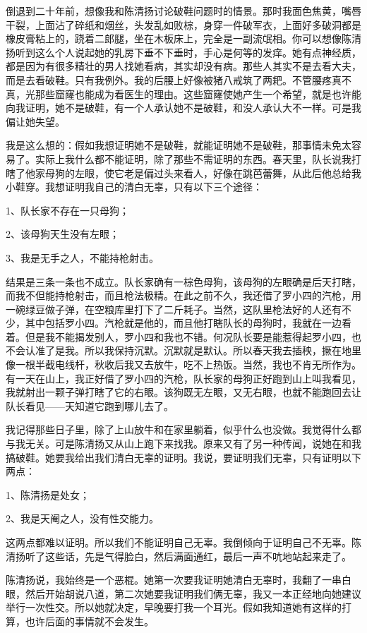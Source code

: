 倒退到二十年前，想像我和陈清扬讨论破鞋问题时的情景。那时我面色焦黄，嘴唇干裂，上面沾了碎纸和烟丝，头发乱如败棕，身穿一件破军衣，上面好多破洞都是橡皮膏粘上的，跷着二郎腿，坐在木板床上，完全是一副流氓相。你可以想像陈清扬听到这么个人说起她的乳房下垂不下垂时，手心是何等的发痒。她有点神经质，都是因为有很多精壮的男人找她看病，其实却没有病。那些人其实不是去看大夫，而是去看破鞋。只有我例外。我的后腰上好像被猪八戒筑了两耙。不管腰疼真不真，光那些窟窿也能成为看医生的理由。这些窟窿使她产生一个希望，就是也许能向我证明，她不是破鞋，有一个人承认她不是破鞋，和没人承认大不一样。可是我偏让她失望。 
 
我是这么想的：假如我想证明她不是破鞋，就能证明她不是破鞋，那事情未免太容易了。实际上我什么都不能证明，除了那些不需证明的东西。春天里，队长说我打瞎了他家母狗的左眼，使它老是偏过头来看人，好像在跳芭蕾舞，从此后他总给我小鞋穿。我想证明我自己的清白无辜，只有以下三个途径： 
 
 1、队长家不存在一只母狗； 
 
 2、该母狗天生没有左眼； 
 
 3、我是无手之人，不能持枪射击。 
 
 结果是三条一条也不成立。队长家确有一棕色母狗，该母狗的左眼确是后天打瞎，而我不但能持枪射击，而且枪法极精。在此之前不久，我还借了罗小四的汽枪，用一碗绿豆做子弹，在空粮库里打下了二斤耗子。当然，这队里枪法好的人还有不少，其中包括罗小四。汽枪就是他的，而且他打瞎队长的母狗时，我就在一边看着。但是我不能揭发别人，罗小四和我也不错。何况队长要是能惹得起罗小四，也不会认准了是我。所以我保持沉默。沉默就是默认。所以春天我去插秧，撅在地里像一根半截电线杆，秋收后我又去放牛，吃不上热饭。当然，我也不肯无所作为。有一天在山上，我正好借了罗小四的汽枪，队长家的母狗正好跑到山上叫我看见，我就射出一颗子弹打瞎了它的右眼。该狗既无左眼，又无右眼，也就不能跑回去让队长看见——天知道它跑到哪儿去了。 
 
 我记得那些日子里，除了上山放牛和在家里躺着，似乎什么也没做。我觉得什么都与我无关。可是陈清扬又从山上跑下来找我。原来又有了另一种传闻，说她在和我搞破鞋。她要我给出我们清白无辜的证明。我说，要证明我们无辜，只有证明以下两点： 
 
 1、陈清扬是处女； 
 
 2、我是天阉之人，没有性交能力。 
 
 这两点都难以证明。所以我们不能证明自己无辜。我倒倾向于证明自己不无辜。陈清扬听了这些话，先是气得脸白，然后满面通红，最后一声不吭地站起来走了。 
 
 陈清扬说，我始终是一个恶棍。她第一次要我证明她清白无辜时，我翻了一串白眼，然后开始胡说八道，第二次她要我证明我们俩无辜，我又一本正经地向她建议举行一次性交。所以她就决定，早晚要打我一个耳光。假如我知道她有这样的打算，也许后面的事情就不会发生。 
 
